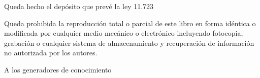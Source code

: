 Queda hecho el depósito que prevé la ley 11.723



\bigskip
\small{
Queda prohibida la reproducción total o parcial de este libro en forma idéntica o modificada por cualquier medio mecánico o electrónico incluyendo fotocopia, grabación o cualquier sistema de almacenamiento y recuperación de información no autorizada por los autores.
}

\newpage

\hfill	\large{ A los generadores de conocimiento} 


\setlength{\abovedisplayskip}{-3pt}
\setlength{\abovedisplayshortskip}{-3pt}